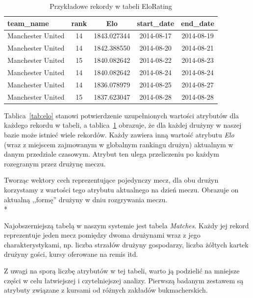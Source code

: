     \begin{table}[H]
    \caption{Przykładowe rekordy w tabeli EloRating}\label{tab:elo_example}
    \centering\footnotesize%
    \begin{tabular}{l c c c c}
    \toprule
        team\_name & rank & Elo & start\_date & end\_date \\
    \midrule
        Manchester United & 14 & 1843.027344 & 2014-08-17 & 2014-08-19\\
        Manchester United & 14 & 1842.388550 & 2014-08-20 & 2014-08-21\\
        Manchester United & 15 & 1840.082642 & 2014-08-22 & 2014-08-23\\
        Manchester United & 14 & 1840.082642 & 2014-08-24 & 2014-08-24\\
        Manchester United & 14 & 1836.078979 & 2014-08-25 & 2014-08-27\\
        Manchester United & 15 & 1837.623047 & 2014-08-28 & 2014-08-28\\
    \bottomrule
    \end{tabular}
    \end{table}
    
    \noindent Tablica~\ref{tab:elo} stanowi potwierdzenie uzupełnionych wartości atrybutów dla każdego rekordu w tabeli, a tablica~\ref{tab:elo_example} obrazuje, że dla każdej drużyny w naszej bazie może istnieć wiele rekordów. Każdy zawiera inną wartość atrybutu \emph{Elo} (wraz z miejscem zajmowanym w globalnym rankingu drużyn) aktualnym w danym przedziale czasowym. Atrybut ten ulega przeliczeniu po każdym rozegranym przez drużynę meczu.
    
    Tworząc wektory cech reprezentujące pojedynczy mecz, dla obu drużyn korzystamy z wartości tego atrybutu aktualnego na dzień meczu. Obrazuje on aktualną ,,formę'' drużyny w dniu rozgrywania meczu. \\*
    
    \noindent Najobszerniejszą tabelą w naszym systemie jest tabela \emph{Matches}. Każdy jej rekord reprezentuje jeden mecz pomiędzy dwoma drużynami wraz z jego charakterystykami, np. liczba strzałów drużyny gospodarzy, liczba żółtych kartek drużyny gości, kursy oferowane na remis itd.
    
    Z uwagi na sporą liczbę atrybutów w tej tabeli, warto ją podzielić na mniejsze części w celu łatwiejszej i czytelniejszej analizy. Pierwszą badanym zestawem są atrybuty związane z kursami od różnych zakładów bukmacherskich.
    
